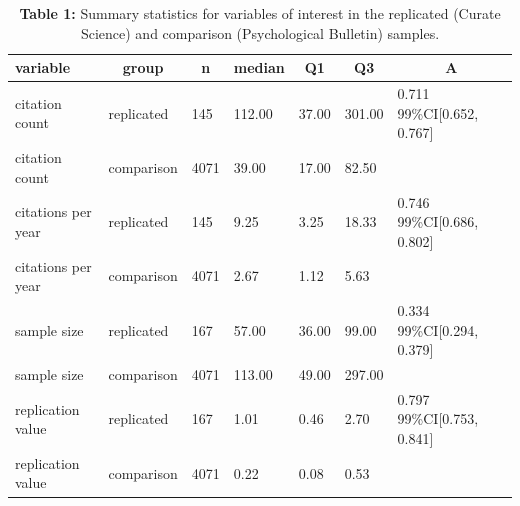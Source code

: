 \documentclass[
  english,
  jou,floatsintext]{apa6}
\begin{document}
\begin{table}[tbp]

\begin{center}
\begin{threeparttable}

\caption{\label{tab:tab1}\textbf{Table 1:} Summary statistics for variables of interest in the replicated (Curate Science) and comparison (Psychological Bulletin) samples.}

\begin{tabular}{lllllll}
\toprule
variable & \multicolumn{1}{c}{group} & \multicolumn{1}{c}{n} & \multicolumn{1}{c}{median} & \multicolumn{1}{c}{Q1} & \multicolumn{1}{c}{Q3} & \multicolumn{1}{c}{A}\\
\midrule
citation count & replicated & 145 & 112.00 & 37.00 & 301.00 & 0.711 99\%CI[0.652, 0.767]\\
citation count & comparison & 4071 & 39.00 & 17.00 & 82.50 & \\
citations per year & replicated & 145 & 9.25 & 3.25 & 18.33 & 0.746 99\%CI[0.686, 0.802]\\
citations per year & comparison & 4071 & 2.67 & 1.12 & 5.63 & \\
sample size & replicated & 167 & 57.00 & 36.00 & 99.00 & 0.334 99\%CI[0.294, 0.379]\\
sample size & comparison & 4071 & 113.00 & 49.00 & 297.00 & \\
replication value & replicated & 167 & 1.01 & 0.46 & 2.70 & 0.797 99\%CI[0.753, 0.841]\\
replication value & comparison & 4071 & 0.22 & 0.08 & 0.53 & \\
\bottomrule
\end{tabular}

\end{threeparttable}
\end{center}

\end{table}
\end{document}

